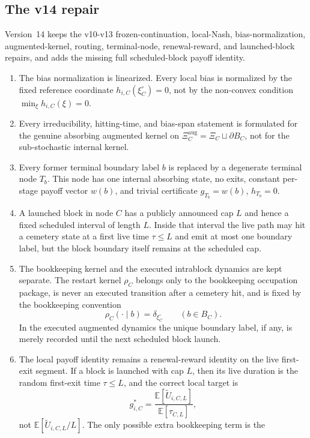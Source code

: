 \documentclass[12pt]{article}
\theoremstyle{definition}
\newcommand{\E}{\mathbb{E}}
\newcommand{\1}{\mathbf{1}}
\begin{document}
\subsection{The v14 repair}

Version~14 keeps the v10-v13 frozen-continuation, local-Nash,
bias-normalization, augmented-kernel, routing, terminal-node, renewal-reward,
and launched-block repairs, and adds the missing full scheduled-block payoff
identity.

\begin{enumerate}[label=\textnormal{(\arabic*)},leftmargin=2.4em]
\item The bias normalization is linearized. Every local bias is normalized by the
fixed reference coordinate $h_{i,C}(\xi_C^\circ)=0$, not by the non-convex
condition $\min_\xi h_{i,C}(\xi)=0$.
\item Every irreducibility, hitting-time, and bias-span statement is formulated
for the genuine absorbing augmented kernel on
$\Xi_C^{\mathrm{aug}}=\Xi_C\sqcup\partial B_C$, not for the sub-stochastic
internal kernel.
\item Every former terminal boundary label $b$ is replaced by a degenerate
terminal node $T_b$. This node has one internal absorbing state, no exits,
constant per-stage payoff vector $w(b)$, and trivial certificate
$g_{T_b}=w(b)$, $h_{T_b}=0$.
\item A launched block in node $C$ has a publicly announced cap $L$ and hence a
fixed scheduled interval of length $L$. Inside that interval the live path may
hit a cemetery state at a first live time $\tau\le L$ and emit at most one
boundary label, but the block boundary itself remains at the scheduled cap.
\item The bookkeeping kernel and the executed intrablock dynamics are kept
separate. The restart kernel $\rho_C$ belongs only to the bookkeeping occupation
package, is never an executed transition after a cemetery hit, and is fixed by
the bookkeeping convention
\[
\rho_C(\cdot\mid b)=\delta_{\xi_C^\circ}
\qquad (b\in B_C).
\]
In the executed augmented dynamics the unique boundary label, if any, is merely
recorded until the next scheduled block launch.
\item The local payoff identity remains a renewal-reward identity on the live
first-exit segment. If a block is launched with cap $L$, then its live duration
is the random first-exit time $\tau\le L$, and the correct local target is
\[
g_{i,C}^*
=
\frac{\E[\widetilde U_{i,C,L}]}{\E[\tau_{C,L}]},
\]
not $\E[\widetilde U_{i,C,L}/L]$. The only possible extra bookkeeping term is the

\end{enumerate}
\end{document}
